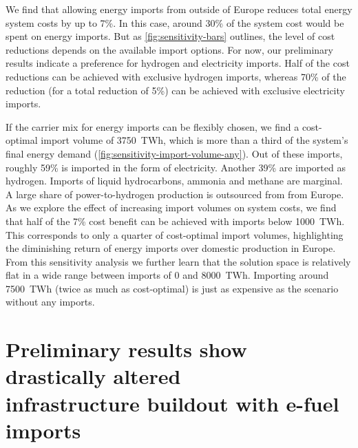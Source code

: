 \documentclass[10pt,5p,reversenotenum,lefttitle]{elsarticle}
\begin{document}
We find that allowing energy imports from outside of Europe reduces total energy
system costs by up to 7\%. In this case, around 30\% of the system cost would be
spent on energy imports. But as \cref{fig:sensitivity-bars} outlines, the level
of cost reductions depends on the available import options. For now, our
preliminary results indicate a preference for hydrogen and electricity imports.
Half of the cost reductions can be achieved with exclusive hydrogen imports,
whereas 70\% of the reduction (for a total reduction of 5\%) can be achieved
with exclusive electricity imports.

If the carrier mix for energy imports can be flexibly chosen, we find a
cost-optimal import volume of 3750~TWh, which is more than a third of the
system's final energy demand (\cref{fig:sensitivity-import-volume-any}). Out of
these imports, roughly 59\% is imported in the form of electricity. Another 39\%
are imported as hydrogen. Imports of liquid hydrocarbons, ammonia and methane
are marginal. A large share of power-to-hydrogen production is outsourced from
from Europe. As we explore the effect of increasing import volumes on system
costs, we find that half of the 7\% cost benefit can be achieved with imports
below 1000~TWh. This corresponds to only a quarter of cost-optimal import
volumes, highlighting the diminishing return of energy imports over domestic
production in Europe. From this sensitivity analysis we further learn that the
solution space is relatively flat in a wide range between imports of 0 and
8000~TWh. Importing around 7500~TWh (twice as much as cost-optimal) is just as
expensive as the scenario without any imports.

\section*{Preliminary results show drastically altered\\infrastructure buildout with e-fuel imports}
\end{document}
